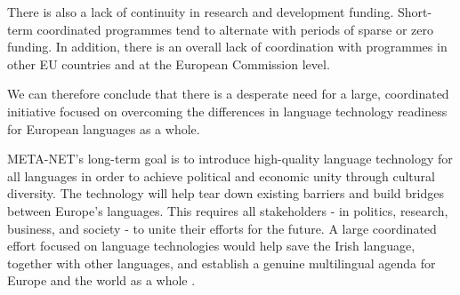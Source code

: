 \documentclass[]{../../metanetpaper}
\begin{document}
\begin{multicols}{2}
There is also a lack of continuity in research and development funding. Short-term coordinated programmes tend to alternate with periods of sparse or zero funding. In addition, there is an overall lack of coordination with programmes in other EU countries and at the European Commission level.

We can therefore conclude that there is a desperate need for a large, coordinated initiative focused on overcoming the differences in language technology readiness for European languages as a whole.

META-NET’s long-term goal is to introduce high-quality language technology for all languages in order to achieve political and economic unity through cultural diversity. The technology will help tear down existing barriers and build bridges between Europe’s languages. This requires all stakeholders - in politics, research, business, and society - to unite their efforts for the future. A large coordinated effort focused on language technologies would help save the Irish language, together with other languages, and establish a genuine multilingual agenda for Europe and the world as a whole \cite{tcstar}. 


\end{multicols}

\clearpage

\end{document}
